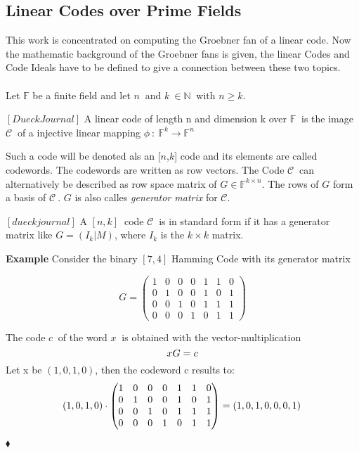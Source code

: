    



\subsection{Linear Codes over Prime Fields}
This work is concentrated on computing the Groebner fan of a linear code. Now the mathematic background of the Groebner fans is given, the linear Codes and Code Ideals have to be defined to give a connection between these two topics.\\ \\
Let $\mathbb{F}$ be a finite field and let $n~$ and $k~\in \mathbb{N}~$ with $n\geq k$.
\begin{env_definition}
$ [Dueck Journal ] $ A linear code of length n and dimension k over $\mathbb{F}~$ is the image $\mathcal{C}~$ of a injective linear mapping $\phi~:~\mathbb{F}^{k} \rightarrow \mathbb{F}^{n}  $
\end{env_definition} 

Such a code will be denoted als an [$n$,$k$] code and its elements are called codewords. The codewords are written 
as row vectors. The Code $\mathcal{C}~$ can alternatively be described as row space matrix of $G \in \mathbb{F}^{k \times n}$. The rows of $G$ form a basis of $\mathcal{C}~$.
$G$ is also calles \textit{generator matrix} for $\mathcal{C}$.

\begin{env_definition}
$[dueckjournal]$
A $[n,k]~$ code $\mathcal{C}~$ is in standard form if it has a generator matrix like $G = (I_{k}| M)$, where $I_{k}$ is the $k \times k$ matrix.
\end{env_definition}


\textbf{Example}
Consider the binary $[7,4]$ Hamming Code with its generator matrix

\[
G =
\begin{pmatrix}
1 & 0 & 0 & 0 & 1 & 1 & 0 \\ 
0 & 1 & 0 & 0 & 1 & 0 & 1 \\  
0 & 0 & 1 & 0 & 1 & 1 & 1 \\ 
0 & 0 & 0 & 1 & 0 & 1 & 1
\end{pmatrix} 
\]

The code $c~$ of the word $x~$ is obtained with the vector-multiplication
\[
     xG = c \\
 \]
 Let x be $\left(1,0,1,0\right)$, then the codeword c results to:
 \[
      \left(1,0,1,0\right) \cdot \begin{pmatrix}
      1 & 0 & 0 & 0 & 1 & 1 & 0 \\ 
      0 & 1 & 0 & 0 & 1 & 0 & 1 \\  
      0 & 0 & 1 & 0 & 1 & 1 & 1 \\ 
      0 & 0 & 0 & 1 & 0 & 1 & 1
      \end{pmatrix}   = \left(1,0,1,0,0,0,1\right) \\
  \]
\begin{flushright}
$\blacklozenge$
\end{flushright} 

